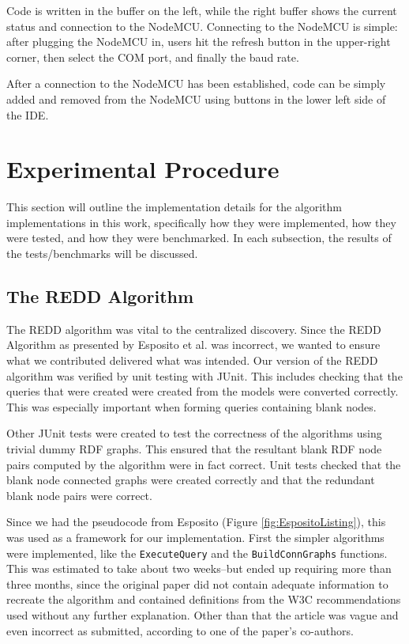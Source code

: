 Code is written in the buffer on the left, while the right buffer shows the current status and connection to the NodeMCU. Connecting to the NodeMCU is simple: after plugging the NodeMCU in, users hit the refresh button in the upper-right corner, then select the COM port, and finally the baud rate.

After a connection to the NodeMCU has been established, code can be simply added and removed from the NodeMCU using buttons in the lower left side of the IDE.

\section{Experimental Procedure}
This section will outline the implementation details for the algorithm implementations in this work, specifically how they were implemented, how they were tested, and how they were benchmarked. In each subsection, the results of the tests/benchmarks will be discussed.


\subsection{The REDD Algorithm}

The REDD algorithm was vital to the centralized discovery. Since the REDD Algorithm as presented by Esposito et al. was incorrect, we wanted to ensure what we contributed delivered what was intended. Our version of the REDD algorithm was verified by unit testing with JUnit. This includes checking that the queries that were created were created from the models were converted correctly. This was especially important when forming queries containing blank nodes.


Other JUnit tests were created to test the correctness of the algorithms using trivial dummy RDF graphs. This ensured that the resultant blank RDF node pairs computed by the algorithm were in fact correct. Unit tests checked that the blank node connected graphs were created correctly and that the redundant blank node pairs were correct.

Since we had the pseudocode from Esposito (Figure \ref{fig:EspositoListing}), this was used as a framework for our implementation. First the simpler algorithms were implemented, like the \texttt{ExecuteQuery} and the \texttt{BuildConnGraphs} functions. This was estimated to take about two weeks--but ended up requiring more than three months, since the original paper did not contain adequate information to recreate the algorithm and contained definitions from the W3C recommendations used without any further explanation. Other than that the article was vague and even incorrect as submitted, according to one of the paper's co-authors.

